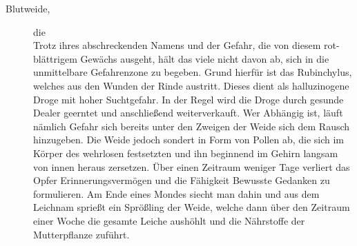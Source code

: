 \documentclass[a4paper,12pt,oneside]{book}
\begin{document}
\begin{description}
\item[Blutweide,] die
\\Trotz ihres abschreckenden Namens und der Gefahr, die von diesem rot-blättrigem Gewächs ausgeht, hält das viele nicht davon ab, sich in die unmittelbare Gefahrenzone zu begeben. Grund hierfür ist das Rubinchylus, welches aus den Wunden der Rinde austritt. Dieses dient als halluzinogene Droge mit hoher Suchtgefahr. In der Regel wird die Droge durch gesunde Dealer geerntet und anschließend weiterverkauft. Wer Abhängig ist, läuft nämlich Gefahr sich bereits unter den Zweigen der Weide sich dem Rausch hinzugeben. Die Weide jedoch sondert in Form von Pollen ab, die sich im Körper des wehrlosen festsetzten und ihn beginnend im Gehirn langsam von innen heraus zersetzen. Über einen Zeitraum weniger Tage verliert das Opfer Erinnerungsvermögen und die Fähigkeit Bewusste Gedanken zu formulieren. Am Ende eines Mondes siecht man dahin und aus dem Leichnam sprießt ein Sprößling der Weide, welche dann über den Zeitraum einer Woche die gesamte Leiche aushöhlt und die Nährstoffe der Mutterpflanze zuführt.


\end{description}
\end{document}
